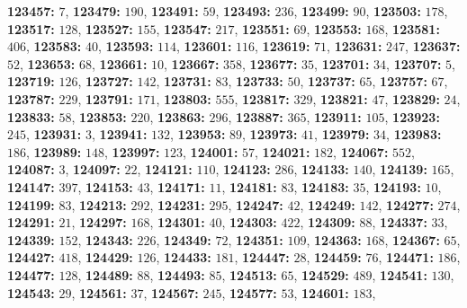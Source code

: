 \textsf{\bfseries 123457:} $7$, \textsf{\bfseries 123479:} $190$, \textsf{\bfseries 123491:} $59$, \textsf{\bfseries 123493:} $236$, \textsf{\bfseries 123499:} $90$, \textsf{\bfseries 123503:} $178$, \textsf{\bfseries 123517:} $128$, \textsf{\bfseries 123527:} $155$, \textsf{\bfseries 123547:} $217$, \textsf{\bfseries 123551:} $69$, \textsf{\bfseries 123553:} $168$, \textsf{\bfseries 123581:} $406$, \textsf{\bfseries 123583:} $40$, \textsf{\bfseries 123593:} $114$, \textsf{\bfseries 123601:} $116$, \textsf{\bfseries 123619:} $71$, \textsf{\bfseries 123631:} $247$, \textsf{\bfseries 123637:} $52$, \textsf{\bfseries 123653:} $68$, \textsf{\bfseries 123661:} $10$, \textsf{\bfseries 123667:} $358$, \textsf{\bfseries 123677:} $35$, \textsf{\bfseries 123701:} $34$, \textsf{\bfseries 123707:} $5$, \textsf{\bfseries 123719:} $126$, \textsf{\bfseries 123727:} $142$, \textsf{\bfseries 123731:} $83$, \textsf{\bfseries 123733:} $50$, \textsf{\bfseries 123737:} $65$, \textsf{\bfseries 123757:} $67$, \textsf{\bfseries 123787:} $229$, \textsf{\bfseries 123791:} $171$, \textsf{\bfseries 123803:} $555$, \textsf{\bfseries 123817:} $329$, \textsf{\bfseries 123821:} $47$, \textsf{\bfseries 123829:} $24$, \textsf{\bfseries 123833:} $58$, \textsf{\bfseries 123853:} $220$, \textsf{\bfseries 123863:} $296$, \textsf{\bfseries 123887:} $365$, \textsf{\bfseries 123911:} $105$, \textsf{\bfseries 123923:} $245$, \textsf{\bfseries 123931:} $3$, \textsf{\bfseries 123941:} $132$, \textsf{\bfseries 123953:} $89$, \textsf{\bfseries 123973:} $41$, \textsf{\bfseries 123979:} $34$, \textsf{\bfseries 123983:} $186$, \textsf{\bfseries 123989:} $148$, \textsf{\bfseries 123997:} $123$, \textsf{\bfseries 124001:} $57$, \textsf{\bfseries 124021:} $182$, \textsf{\bfseries 124067:} $552$, \textsf{\bfseries 124087:} $3$, \textsf{\bfseries 124097:} $22$, \textsf{\bfseries 124121:} $110$, \textsf{\bfseries 124123:} $286$, \textsf{\bfseries 124133:} $140$, \textsf{\bfseries 124139:} $165$, \textsf{\bfseries 124147:} $397$, \textsf{\bfseries 124153:} $43$, \textsf{\bfseries 124171:} $11$, \textsf{\bfseries 124181:} $83$, \textsf{\bfseries 124183:} $35$, \textsf{\bfseries 124193:} $10$, \textsf{\bfseries 124199:} $83$, \textsf{\bfseries 124213:} $292$, \textsf{\bfseries 124231:} $295$, \textsf{\bfseries 124247:} $42$, \textsf{\bfseries 124249:} $142$, \textsf{\bfseries 124277:} $274$, \textsf{\bfseries 124291:} $21$, \textsf{\bfseries 124297:} $168$, \textsf{\bfseries 124301:} $40$, \textsf{\bfseries 124303:} $422$, \textsf{\bfseries 124309:} $88$, \textsf{\bfseries 124337:} $33$, \textsf{\bfseries 124339:} $152$, \textsf{\bfseries 124343:} $226$, \textsf{\bfseries 124349:} $72$, \textsf{\bfseries 124351:} $109$, \textsf{\bfseries 124363:} $168$, \textsf{\bfseries 124367:} $65$, \textsf{\bfseries 124427:} $418$, \textsf{\bfseries 124429:} $126$, \textsf{\bfseries 124433:} $181$, \textsf{\bfseries 124447:} $28$, \textsf{\bfseries 124459:} $76$, \textsf{\bfseries 124471:} $186$, \textsf{\bfseries 124477:} $128$, \textsf{\bfseries 124489:} $88$, \textsf{\bfseries 124493:} $85$, \textsf{\bfseries 124513:} $65$, \textsf{\bfseries 124529:} $489$, \textsf{\bfseries 124541:} $130$, \textsf{\bfseries 124543:} $29$, \textsf{\bfseries 124561:} $37$, \textsf{\bfseries 124567:} $245$, \textsf{\bfseries 124577:} $53$, \textsf{\bfseries 124601:} $183$, 
